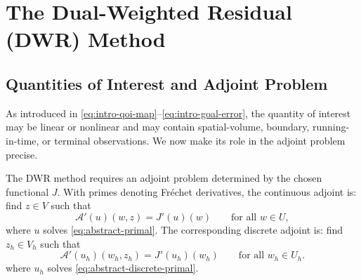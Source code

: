 \section{The Dual-Weighted Residual (DWR) Method}
\label{sec:background-dwr}

\subsection{Quantities of Interest and Adjoint Problem}
\label{sec:background-qoi}

As introduced in \eqref{eq:intro-qoi-map}--\eqref{eq:intro-goal-error}, the quantity of interest may be linear or nonlinear and may contain spatial-volume, boundary, running-in-time, or terminal observations. We now make its role in the adjoint problem precise.

The DWR method requires an adjoint problem determined by the chosen functional \(J\). With primes denoting Fr\'echet derivatives, the continuous adjoint is: find \(z\in V\) such that
\begin{equation}
  \mathcal{A}'(u)(w,z)=J'(u)(w)
  \qquad\text{for all }w\in U,
  \label{eq:nonlinear-adjoint}
\end{equation}
where \(u\) solves \eqref{eq:abstract-primal}. The corresponding discrete adjoint is: find \(z_h\in V_h\) such that
\begin{equation}
  \mathcal{A}'(u_h)(w_h,z_h)=J'(u_h)(w_h)
  \qquad\text{for all }w_h\in U_h.
  \label{eq:discrete-nonlinear-adjoint}
\end{equation}
where \(u_h\) solves \eqref{eq:abstract-discrete-primal}.


